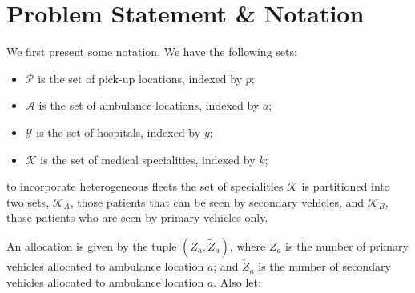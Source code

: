 \documentclass[numbers,webpdf,imaman]{ima-authoring-template}%
\begin{document}
\section{Problem Statement \& Notation}\label{sec:problem_description}
We first present some notation. We have the following sets:

\begin{itemize}
  \item $\mathcal{P}$ is the set of pick-up locations, indexed by $p$;
  \item $\mathcal{A}$ is the set of ambulance locations, indexed by $a$;
  \item $\mathcal{Y}$ is the set of hospitals, indexed by $y$;
  \item $\mathcal{K}$ is the set of medical specialities, indexed by $k$;
\end{itemize}

\noindent
to incorporate heterogeneous fleets the set of specialities $\mathcal{K}$ is
partitioned into two sets, $\mathcal{K}_A$, those patients that can be seen by
secondary vehicles, and $\mathcal{K}_B$, those patients who are seen by
primary vehicles only.

An allocation is given by the tuple $\left(Z_a, \tilde{Z}_a\right)$, where $Z_a$
is the number of primary vehicles allocated to ambulance location $a$; and
$\tilde{Z}_a$ is the number of secondary vehicles allocated to ambulance
location $a$. Also let:
\end{document}
